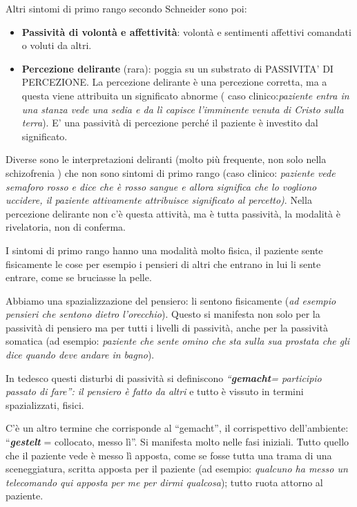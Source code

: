 Altri sintomi di primo rango secondo Schneider sono poi:

\begin{itemize}
\item
  \textbf{Passività di volontà e affettività}: volontà e sentimenti
  affettivi comandati o voluti da altri.
\item
  \textbf{Percezione delirante} (rara): poggia su un substrato di
  PASSIVITA' DI PERCEZIONE. La percezione delirante è una percezione
  corretta, ma a questa viene attribuita un significato abnorme ( caso
  clinico:\emph{paziente entra in una stanza vede una sedia e da lì
  capisce l'imminente venuta di Cristo sulla terra}). E' una passività
  di percezione perché il paziente è investito dal significato.
\end{itemize}

Diverse sono le interpretazioni deliranti (molto più frequente, non solo
nella schizofrenia ) che non sono sintomi di primo rango (caso clinico:
\emph{paziente vede semaforo rosso e dice che è rosso sangue e allora
significa che lo vogliono uccidere, il paziente attivamente attribuisce
significato al percetto)}. Nella percezione delirante non c'è questa
attività, ma è tutta passività, la modalità è rivelatoria, non di
conferma.

I sintomi di primo rango hanno una modalità molto fisica, il paziente
sente fisicamente le cose per esempio i pensieri di altri che entrano in
lui li sente entrare, come se bruciasse la pelle.

Abbiamo una spazializzazione del pensiero: li sentono fisicamente
(\emph{ad esempio pensieri che sentono dietro l'orecchio}). Questo si
manifesta non solo per la passività di pensiero ma per tutti i livelli
di passività, anche per la passività somatica (ad esempio:
\emph{paziente che sente omino che sta sulla sua prostata che gli dice
quando deve andare in bagno}).

In tedesco questi disturbi di passività si definiscono
\emph{``\textbf{\emph{gemacht}}= participio passato di fare'': il
pensiero è fatto da altri} e tutto è vissuto in termini spazializzati,
fisici.

C'è un altro termine che corrisponde al ``gemacht'', il corrispettivo
dell'ambiente: ``\emph{\textbf{\emph{gestelt}}} = collocato, messo lì''.
Si manifesta molto nelle fasi iniziali. Tutto quello che il paziente
vede è messo lì apposta, come se fosse tutta una trama di una
sceneggiatura, scritta apposta per il paziente (ad esempio:
\emph{qualcuno ha messo un telecomando qui apposta per me per dirmi
qualcosa}); tutto ruota attorno al paziente.

